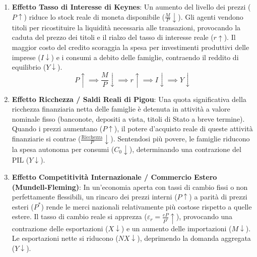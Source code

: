 \begin{enumerate}
    \item \textbf{Effetto Tasso di Interesse di Keynes}:
    Un aumento del livello dei prezzi ($P \uparrow$) riduce lo stock reale di moneta disponibile ($\frac{M}{P} \downarrow$). Gli agenti vendono titoli per ricostituire la liquidità necessaria alle transazioni, provocando la caduta del prezzo dei titoli e il rialzo del tasso di interesse reale ($r \uparrow$). Il maggior costo del credito scoraggia la spesa per investimenti produttivi delle imprese ($I \downarrow$) e i consumi a debito delle famiglie, contraendo il reddito di equilibrio ($Y \downarrow$).
    \begin{equation}
        P \uparrow \implies \frac{M}{P} \downarrow \implies r \uparrow \implies I \downarrow \implies Y \downarrow
    \end{equation}
    
    \item \textbf{Effetto Ricchezza / Saldi Reali di Pigou}:
    Una quota significativa della ricchezza finanziaria netta delle famiglie è detenuta in attività a valore nominale fisso (banconote, depositi a vista, titoli di Stato a breve termine). Quando i prezzi aumentano ($P \uparrow$), il potere d'acquisto reale di queste attività finanziarie si contrae ($\frac{\text{Ricchezza}}{P} \downarrow$). Sentendosi più povere, le famiglie riducono la spesa autonoma per consumi ($C_0 \downarrow$), determinando una contrazione del PIL ($Y \downarrow$).
    
    \item \textbf{Effetto Competitività Internazionale / Commercio Estero (Mundell-Fleming)}:
    In un'economia aperta con tassi di cambio fissi o non perfettamente flessibili, un rincaro dei prezzi interni ($P \uparrow$) a parità di prezzi esteri ($P^*$) rende le merci nazionali relativamente più costose rispetto a quelle estere. Il tasso di cambio reale si apprezza ($\varepsilon_r = \frac{e P}{P^*} \uparrow$), provocando una contrazione delle esportazioni ($X \downarrow$) e un aumento delle importazioni ($M \downarrow$). Le esportazioni nette si riducono ($NX \downarrow$), deprimendo la domanda aggregata ($Y \downarrow$).
\end{enumerate}

